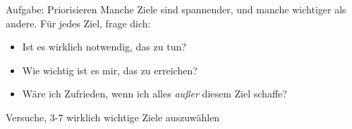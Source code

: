\begin{frame}[c]
    \begin{block}{Aufgabe: Priorisieren}
    Manche Ziele sind spannender, und manche wichtiger als andere. Für jedes
    Ziel, frage dich:
    \begin{itemize}
        \item Ist es wirklich notwendig, das zu tun?
        \item Wie wichtig ist es mir, das zu erreichen?
        \item Wäre ich Zufrieden, wenn ich alles {\em außer} diesem Ziel schaffe?
    \end{itemize} \pause
    Versuche, 3-7 wirklich wichtige Ziele auszuwählen
    \end{block}
\end{frame}

\fpause
{}
